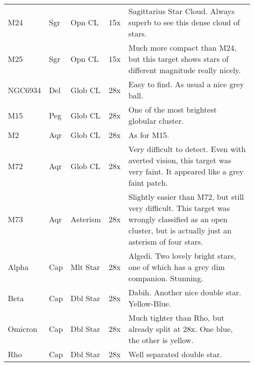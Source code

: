 \begin{longtable}{ p{0.7in}  p{0.3in}  p{0.6in}  p{0.9in}  p{5.8in} }
M24 & Sgr & Opn CL & 15x & Sagittarius Star Cloud. Always superb to see this dense cloud of stars.  \\ 
M25 & Sgr & Opn CL & 15x & Much more compact than M24, but this target shows stars of different magnitude really nicely. \\ 
NGC6934 & Del & Glob CL & 28x & Easy to find. As usual a nice grey ball. \\ 
M15 & Peg & Glob CL & 28x & One of the most brightest globular cluster.  \\ 
M2 & Aqr & Glob CL & 28x & As for M15. \\ 
M72 & Aqr & Glob CL & 28x & Very difficult to detect. Even with averted vision, this target was very faint. It appeared like a grey faint patch. \\ 
M73 & Aqr & Asterism & 28x & Slightly easier than M72, but still very difficult. This target was wrongly classified as an open cluster, but is actually just an asterism of four stars.  \\ 
Alpha & Cap & Mlt Star & 28x & Algedi. Two lovely bright stars, one of which has a grey dim companion. Stunning. \\ 
Beta & Cap & Dbl Star & 28x & Dabih. Another nice double star. Yellow-Blue. \\ 
Omicron & Cap & Dbl Star & 28x & Much tighter than Rho, but already split at 28x. One blue, the other is yellow. \\ 
Rho & Cap & Dbl Star & 28x & Well separated double star. \\ 
\hline 
\end{longtable} 

